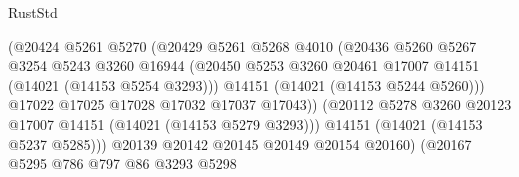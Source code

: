 \begin{lexlean}{RustStd}
\begin{coremodule}
                                        (@20424
                                          @5261
                                          @5270
                                          (@20429
                                            @5261
                                            @5268
                                            @4010
                                            (@20436
                                              @5260
                                              @5267
                                              @3254
                                              @5243
                                              @3260
                                              @16944
                                              (@20450
                                                @5253
                                                @3260
                                                @20461
                                                @17007
                                                @14151
                                                (@14021 (@14153 @5254 @3293)))
                                              @14151
                                              (@14021 (@14153 @5244 @5260)))
                                            @17022
                                            @17025
                                            @17028
                                            @17032
                                            @17037
                                            @17043))
                                        (@20112
                                          @5278
                                          @3260
                                          @20123
                                          @17007
                                          @14151
                                          (@14021 (@14153 @5279 @3293)))
                                        @14151
                                        (@14021 (@14153 @5237 @5285)))
                                      @20139
                                      @20142
                                      @20145
                                      @20149
                                      @20154
                                      @20160)
                                    (@20167
                                      @5295
                                      @786
                                      @797
                                      @86
                                      @3293
                                      @5298

\end{coremodule}
\end{lexlean}
